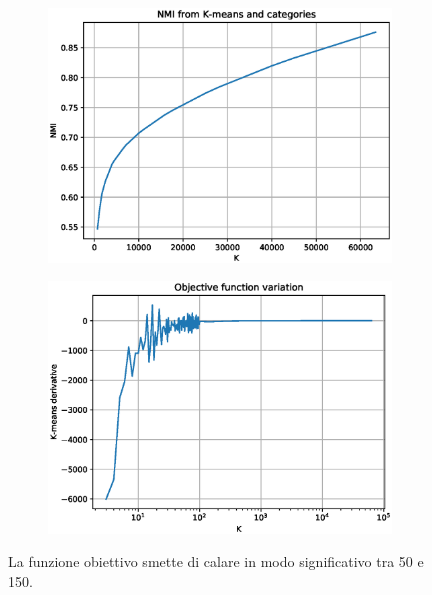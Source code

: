\documentclass[
	11pt, %
	a4paper, %
	oneside, %
	headinclude,footinclude, %
	BCOR5mm, %
]{scrartcl}
\begin{document}
		\begin{figure}[!htb]
			\hspace{-1cm}
			\begin{subfigure}{.5\textwidth}
				\centering
				\includegraphics[scale=.5]{../results/NMI-kmeans-categories.eps}
			\end{subfigure}
			\hspace{0.5cm}
			\begin{subfigure}{.5\textwidth}
				\centering
				\includegraphics[scale=.5]{../results/KMeansDerivative.eps}
			\end{subfigure}
			\caption{La funzione obiettivo smette di calare in modo significativo tra 50 e 150.}
			\label{fig:KMeansObj}
		\end{figure}
\end{document}
